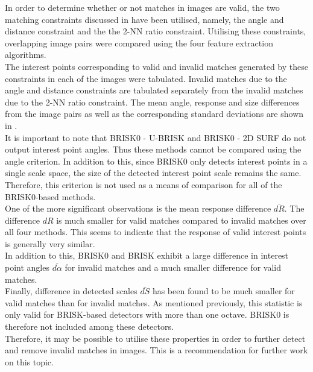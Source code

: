 \documentclass[11pt]{report}
\begin{document}
In order to determine whether or not matches in images are valid, the two matching constraints discussed in  have been utilised, namely, the angle and distance constraint and the the 2-NN ratio constraint. Utilising these constraints, overlapping image pairs were compared using the four feature extraction algorithms. \\

The interest points corresponding to valid and invalid matches generated by these constraints in each of the images were tabulated. Invalid matches due to the angle and distance constraints are tabulated separately from the invalid matches due to the 2-NN ratio constraint. The mean angle, response and size differences from the image pairs as well as the corresponding standard deviations are shown in .\\

It is important to note that BRISK0 - U-BRISK and BRISK0 - 2D SURF do not output interest point angles. Thus these methods cannot be compared using the angle criterion. In addition to this, since BRISK0 only detects interest points in a single scale space, the size of the detected interest point scale remains the same. Therefore, this criterion is not used as a means of comparison for all of the BRISK0-based methods.\\

One of the more significant observations is the mean response difference $\bar{dR}$. The difference $dR$ is much smaller for valid matches compared to invalid matches over all four methods. This seems to indicate that the response of valid interest points is generally very similar.\\

In addition to this, BRISK0 and BRISK exhibit a large difference in interest point angles $\bar{d\alpha}$ for invalid matches and a much smaller difference for valid matches. \\

Finally, difference in detected scales $\bar{dS}$ has been found to be much smaller for valid matches than for invalid matches. As mentioned previously, this statistic is only valid for BRISK-based detectors with more than one octave. BRISK0 is therefore not included among these detectors.\\

Therefore, it may be possible to utilise these properties in order to further detect and remove invalid matches in images. This is a recommendation for further work on this topic.\\
\end{document}

